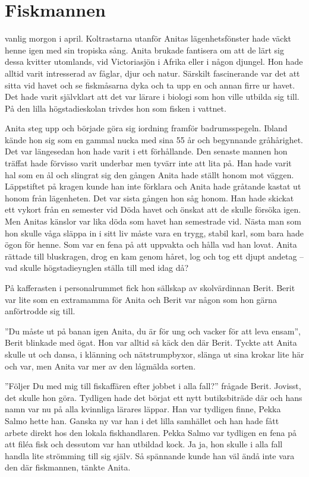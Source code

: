 \chapter[fiskmannen]{Fiskmannen}

 vanlig morgon i april. Koltrastarna utanför Anitas lägenhetsfönster hade väckt henne igen med sin tropiska sång. Anita brukade fantisera om att de lärt sig dessa kvitter utomlands, vid Victoriasjön i Afrika eller i någon djungel. Hon hade alltid varit intresserad av fåglar, djur och natur. Särskilt fascinerande var det att sitta vid havet och se fiskmåsarna dyka och ta upp en och annan firre ur havet. Det hade varit självklart att det var lärare i biologi som hon ville utbilda sig till. På den lilla högstadieskolan trivdes hon som fisken i vattnet.

Anita steg upp och började göra sig iordning framför badrumsspegeln. Ibland kände hon sig som en gammal nucka med sina 55 år och begynnande gråhårighet. Det var längesedan hon hade varit i ett förhållande. Den senaste mannen hon träffat hade förvisso varit underbar men tyvärr inte att lita på. Han hade varit hal som en ål och slingrat sig den gången Anita hade ställt honom mot väggen. Läppstiftet på kragen kunde han inte förklara och Anita hade gråtande kastat ut honom från lägenheten. Det var sista gången hon såg honom. Han hade skickat ett vykort från en semester vid Döda havet och önskat att de skulle försöka igen. Men Anitas känslor var lika döda som havet han semestrade vid. Nästa man som hon skulle våga släppa in i sitt liv måste vara en trygg, stabil karl, som bara hade ögon för henne. Som var en fena på att uppvakta och hålla vad han lovat. Anita rättade till bluskragen, drog en kam genom håret, log och tog ett djupt andetag – vad skulle högstadieynglen ställa till med idag då?

På kafferasten i personalrummet fick hon sällskap av skolvärdinnan Berit. Berit var lite som en extramamma för Anita och Berit var någon som hon gärna anförtrodde sig till. 

”Du måste ut på banan igen Anita, du är för ung och vacker för att leva ensam”, Berit blinkade med ögat. Hon var alltid så käck den där Berit. Tyckte att Anita skulle ut och dansa, i klänning och nätstrumpbyxor, slänga ut sina krokar lite här och var, men Anita var mer av den lågmälda sorten. 

”Följer Du med mig till fiskaffären efter jobbet i alla fall?” frågade Berit. Jovisst, det skulle hon göra. Tydligen hade det börjat ett nytt butiksbiträde där och hans namn var nu på alla kvinnliga lärares läppar. Han var tydligen finne, Pekka Salmo hette han. Ganska ny var han i det lilla samhället och han hade fått arbete direkt hos den lokala fiskhandlaren. Pekka Salmo var tydligen en fena på att filéa fisk och dessutom var han utbildad kock. Ja ja, hon skulle i alla fall handla lite strömming till sig själv. Så spännande kunde han väl ändå inte vara den där fiskmannen, tänkte Anita.

